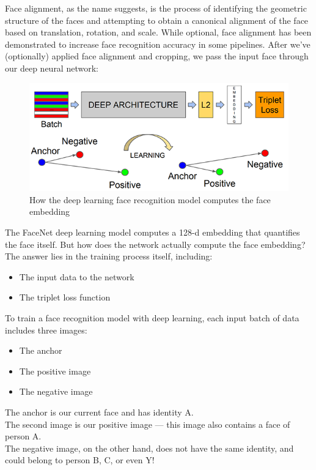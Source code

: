     Face alignment, as the name suggests, is the process of identifying the geometric structure of the faces and attempting to obtain a canonical alignment of the face based on translation, 
    rotation, and scale. While optional, face alignment has been demonstrated to increase face recognition accuracy in some pipelines. After we’ve (optionally) applied face alignment 
    and cropping, we pass the input face through our deep neural network:
    \begin{figure}[H]
        \centering
        \includegraphics[width=0.6\linewidth]{img/pyimgsearch.png}
        \caption{How the deep learning face recognition model computes the face embedding}
    \end{figure}
    The FaceNet deep learning model computes a 128-d embedding that quantifies the face itself. But how does the network actually compute the face embedding? The answer lies in the training 
    process itself, including:
    \begin{itemize}
        \item The input data to the network
        \item The triplet loss function
    \end{itemize}
    To train a face recognition model with deep learning, each input batch of data includes three images:
    \begin{itemize}
        \item The anchor
        \item The positive image
        \item The negative image
    \end{itemize}
    The anchor is our current face and has identity A. \\ 
    \vspace{3mm}
    The second image is our positive image — this image also contains a face of person A. \\ 
    \vspace{3mm}
    The negative image, on the other hand, does not have the same identity, and could belong to person B, C, or even Y! \\
    \vspace{3mm}
